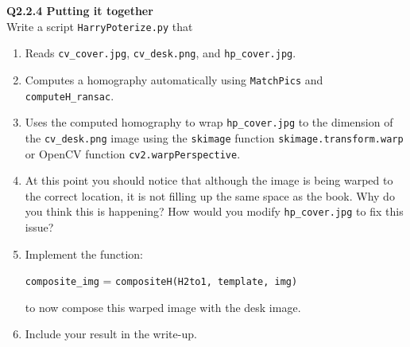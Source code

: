 \documentclass[12pt,letterpaper, onecolumn]{exam}
\begin{document}
\begin{questions}
    \question \textbf{Q2.2.4 Putting it together} \\
    Write a script \texttt{HarryPoterize.py} that
    \begin{enumerate}
        \item Reads \texttt{cv\_cover.jpg}, \texttt{cv\_desk.png}, and \texttt{hp\_cover.jpg}.
        \item Computes a homography automatically using \texttt{MatchPics} and \texttt{computeH\_ransac}.
        \item Uses the computed homography to wrap \texttt{hp\_cover.jpg} to the dimension of the \texttt{cv\_desk.png} image using the \texttt{skimage} function \texttt{skimage.transform.warp} or OpenCV function \texttt{cv2.warpPerspective}.
        \item At this point you should notice that although the image is being warped to the correct location, it is not filling up the same space as the book. Why do you think this is happening? How would you modify \texttt{hp\_cover.jpg} to fix this issue?
        \item Implement the function:
            \begin{center}
                \texttt{composite\_img} = \texttt{compositeH(H2to1, template, img)}
            \end{center}
            to now compose this warped image with the desk image.
        \item Include your result in the write-up.
    \end{enumerate}


\end{questions}
\end{document}
